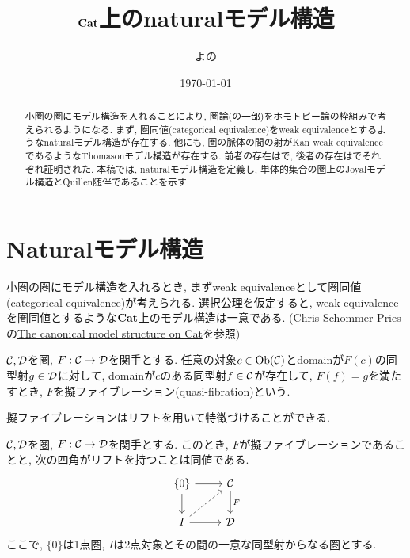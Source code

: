 \documentclass[uplatex, a4paper, 14Q, dvipdfmx]{jsarticle}
\title{$\mathbf{Cat}$上のnaturalモデル構造}
\author{よの}
\date{\today}
\begin{document}
\maketitle

\begin{abstract}
  小圏の圏にモデル構造を入れることにより, 圏論(の一部)をホモトピー論の枠組みで考えられるようになる. 
  まず, 圏同値(categorical equivalence)をweak equivalenceとするようなnaturalモデル構造が存在する. 
  他にも, 圏の脈体の間の射がKan weak equivalenceであるようなThomasonモデル構造が存在する. 
  前者の存在は\cite{Rezk96}で, 後者の存在は\cite{Thom80}でそれぞれ証明された. 
  本稿では, naturalモデル構造を定義し, 単体的集合の圏上のJoyalモデル構造とQuillen随伴であることを示す.  
\end{abstract}

\tableofcontents

\section{Naturalモデル構造}

小圏の圏にモデル構造を入れるとき, まずweak equivalenceとして圏同値(categorical equivalence)が考えられる. 
選択公理を仮定すると, weak equivalenceを圏同値とするような$\mathbf{Cat}$上のモデル構造は一意である. 
(Chris Schommer-Priesの\href{https://sbseminar.wordpress.com/2012/11/16/the-canonical-model-structure-on-cat/}{The canonical model structure on Cat}を参照)

\begin{definition}[擬ファイブレーション]
  $\mathcal{C},\mathcal{D}$を圏, $F : \mathcal{C} \to \mathcal{D}$を関手とする. 
  任意の対象$c \in \mathrm{Ob}(\mathcal{C})$とdomainが$F(c)$の同型射$g \in \mathcal{D}$に対して, domainが$c$のある同型射$f \in \mathcal{C}$が存在して, $F(f)=g$を満たすとき, $F$を擬ファイブレーション(quasi-fibration)という. 
\end{definition}

擬ファイブレーションはリフトを用いて特徴づけることができる. 

\begin{remark} \label{rem:quasi_fibration_has_RLP}
  $\mathcal{C},\mathcal{D}$を圏, $F : \mathcal{C} \to \mathcal{D}$を関手とする. 
  このとき, $F$が擬ファイブレーションであることと, 次の四角がリフトを持つことは同値である. 
  \[\begin{tikzcd}
    {\{0\}} & \C \\
    I & \D
    \arrow["F", from=1-2, to=2-2]
    \arrow[from=1-1, to=2-1]
    \arrow[from=2-1, to=2-2]
    \arrow[from=1-1, to=1-2]
    \arrow[dashed, from=2-1, to=1-2]
  \end{tikzcd}\]
  ここで, $\{0\}$は1点圏, $I$は2点対象とその間の一意な同型射からなる圏とする. 
\end{remark}
\end{document}

